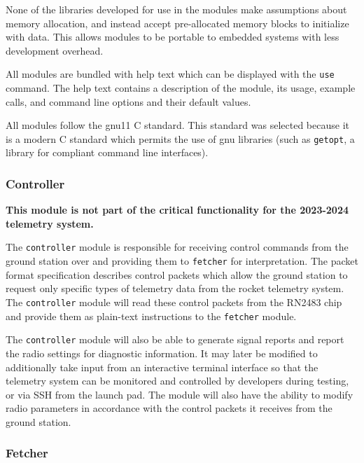 None of the libraries developed for use in the modules make assumptions about memory allocation, and instead accept
pre-allocated memory blocks to initialize with data. This allows modules to be portable to embedded systems with less
development overhead.

All modules are bundled with help text which can be displayed with the \texttt{use} command. The help text contains a
description of the module, its usage, example calls, and command line options and their default values.

All modules follow the gnu11 C standard. This standard was selected because it is a modern C standard which permits the
use of \gls{gnu} libraries (such as \texttt{getopt}, a library for  compliant command line
interfaces).

\subsubsection{Controller}

\textbf{This module is not part of the critical functionality for the 2023-2024  telemetry
    system.}

The \texttt{controller} module is responsible for receiving control commands from the ground station over
 and providing them to \texttt{fetcher} for interpretation. The  packet format
specification describes control packets which allow the ground station to request only specific types of telemetry data
from the rocket telemetry system. \cite{telemetry-format} The \texttt{controller} module will read these control
packets from the  RN2483 chip and provide them as plain-text instructions to the \texttt{fetcher}
module.

The \texttt{controller} module will also be able to generate signal reports and report the  radio
settings for diagnostic information. It may later be modified to additionally take input from an interactive terminal
interface so that the telemetry system can be monitored and controlled by developers during testing, or via SSH from
the launch pad. The module will also have the ability to modify radio parameters in accordance with the control packets
it receives from the ground station.

\subsubsection{Fetcher}

